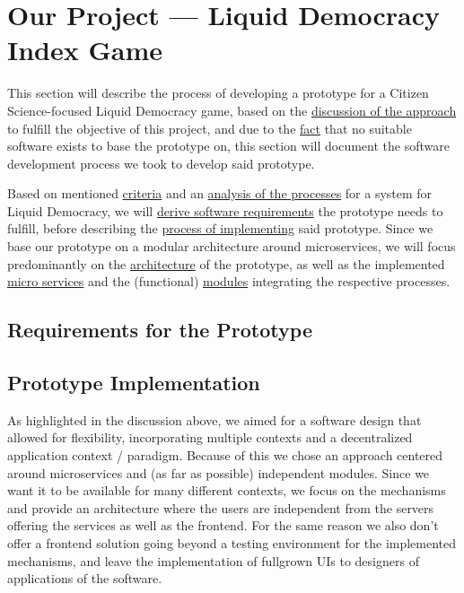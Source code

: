 \chapter{Our Project — Liquid Democracy Index Game}
\label{ch:ProjectRequirements}


This section will describe the process of developing a prototype for a Citizen Science-focused Liquid Democracy game, based on the \href{sec:Approach}{discussion of the approach} to fulfill the objective of this project, and due to the \href{sec:DiscussionRW}{fact} that no suitable software exists to base the prototype on, this section will document the software development process we took to develop said prototype.

Based on mentioned \href{sec:Criteria}{criteria} and an \href{sec:AnalysisProcesses}{analysis of the processes} for a system for Liquid Democracy, we will \href{sec:SoftwareRequirements}{derive software requirements} the prototype needs to fulfill, before describing the \href{sec:Implementation}{process of implementing} said prototype. Since we base our prototype on a modular architecture around microservices, we will focus predominantly on the \href{ssec:Architecture}{architecture} of the prototype, as well as the implemented \href{ssec:Microservices}{micro services} and the (functional) \href{ssec:Modules}{modules} integrating the respective processes. 

\section{Requirements for the Prototype}
\label{sec:SoftwareRequirements}
\section{Prototype Implementation}
\label{sec:Implementation}

As highlighted in the discussion above, we aimed for a software design that allowed for flexibility, incorporating multiple contexts and a decentralized application context / paradigm. Because of this we chose an approach centered around microservices and (as far as possible) independent modules. Since we want it to be available for many different contexts, we focus on the mechanisms and provide an architecture where the users are independent from the servers offering the services as well as the frontend. For the same reason we also don't offer a frontend solution going beyond a testing environment for the implemented mechanisms, and leave the implementation of fullgrown UIs to designers of applications of the software.

